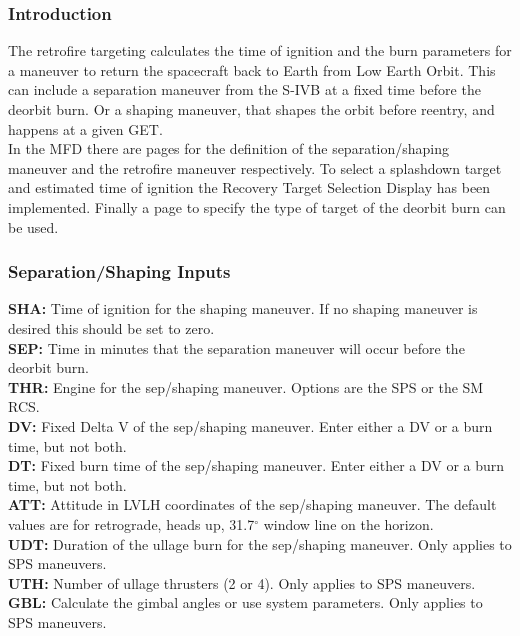 \documentclass[11pt]{article} %
\begin{document}
\subsubsection{Introduction}

The retrofire targeting calculates the time of ignition and the burn parameters for a maneuver to return the spacecraft back to Earth from Low Earth Orbit. This can include a separation maneuver from the S-IVB at a fixed time before the deorbit burn. Or a shaping maneuver, that shapes the orbit before reentry, and happens at a given GET.\\

In the MFD there are pages for the definition of the separation/shaping maneuver and the retrofire maneuver respectively. To select a splashdown target and estimated time of ignition the Recovery Target Selection Display has been implemented. Finally a page to specify the type of target of the deorbit burn can be used.\\

\subsubsection{Separation/Shaping Inputs}

\textbf{SHA:} Time of ignition for the shaping maneuver. If no shaping maneuver is desired this should be set to zero.\\
\textbf{SEP:} Time in minutes that the separation maneuver will occur before the deorbit burn.\\
\textbf{THR:} Engine for the sep/shaping maneuver. Options are the SPS or the SM RCS.\\
\textbf{DV:} Fixed Delta V of the sep/shaping maneuver. Enter either a DV or a burn time, but not both.\\
\textbf{DT:} Fixed burn time of the sep/shaping maneuver. Enter either a DV or a burn time, but not both.\\
\textbf{ATT:} Attitude in LVLH coordinates of the sep/shaping maneuver. The default values are for retrograde, heads up, 31.7$^{\circ}$ window line on the horizon.\\

\textbf{UDT:} Duration of the ullage burn for the sep/shaping maneuver. Only applies to SPS maneuvers.\\
\textbf{UTH:} Number of ullage thrusters (2 or 4). Only applies to SPS maneuvers.\\
\textbf{GBL:} Calculate the gimbal angles or use system parameters. Only applies to SPS maneuvers.\\
\end{document}
